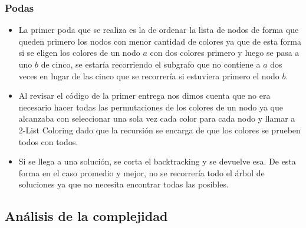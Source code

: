 \subsubsection{Podas}

\begin{itemize}
	\item La primer poda que se realiza es la de ordenar la lista de nodos de forma que queden primero los nodos con menor cantidad de colores ya que de esta forma si se eligen los colores de un nodo $a$ con dos colores primero y luego se pasa a uno $b$ de cinco, se estaría recorriendo el subgrafo que no contiene a $a$ dos veces en lugar de las cinco que se recorrería si estuviera primero el nodo $b$.
	
	\item Al revisar el código de la primer entrega nos dimos cuenta que no era necesario hacer todas las permutaciones de los colores de un nodo ya que alcanzaba con seleccionar una sola vez cada color para cada nodo y llamar a 2-List Coloring dado que la recursión se encarga de que los colores se prueben todos con todos.
	\item Si se llega a una solución, se corta el backtracking y se devuelve esa. De esta forma en el caso promedio y mejor, no se recorrería todo el árbol de soluciones ya que no necesita encontrar todas las posibles.
\end{itemize}

\subsection{Análisis de la complejidad}

